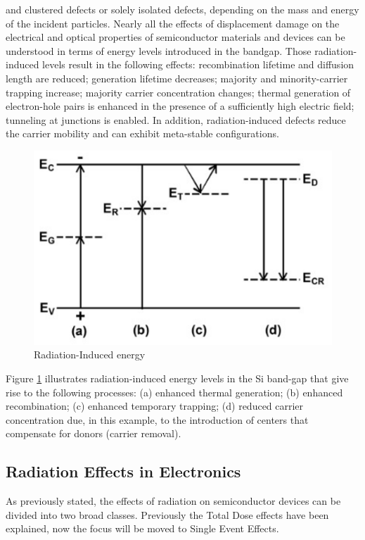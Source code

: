 \documentclass[./dissertation.tex]{subfiles}
\begin{document}
and clustered defects or solely isolated defects, depending on the mass and energy of
the incident particles. Nearly all the effects of displacement damage on the electrical and optical properties of semiconductor materials and devices can be understood
in terms of energy levels introduced in the bandgap. Those radiation-induced levels
result in the following effects: recombination lifetime and diffusion length are reduced; generation lifetime decreases; majority and minority-carrier trapping increase;
majority carrier concentration changes; thermal generation of electron-hole pairs is
enhanced in the presence of a sufficiently high electric field; tunneling at junctions
is enabled. In addition, radiation-induced defects reduce the carrier mobility and can
exhibit meta-stable configurations\cite{bib10}.

\begin{figure}[h!]
\centering
  \includegraphics[scale = 0.50]{imgs/displ.png}
  \caption{Radiation-Induced energy}
  \label{fig:displ}
\end{figure}
Figure \ref{fig:displ} illustrates radiation-induced energy
levels in the Si band-gap that give rise to the following processes: (a) enhanced thermal generation; (b) enhanced recombination; (c) enhanced temporary trapping; (d)
reduced carrier concentration due, in this example, to the introduction of centers that
compensate for donors (carrier removal).
\subsection{Radiation Effects in Electronics}
As previously stated, the effects of radiation on semiconductor devices can be divided into two broad classes. Previously the Total Dose effects have been explained, now the focus will be moved to Single Event Effects.
\end{document}
